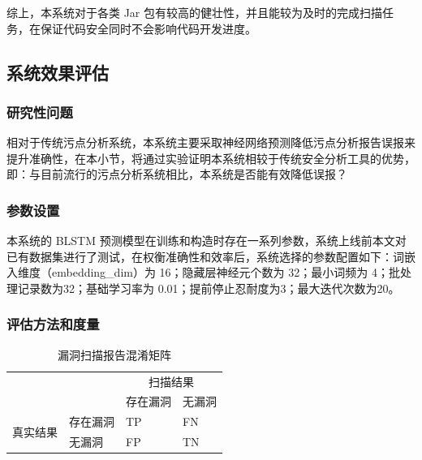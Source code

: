 综上，本系统对于各类 Jar 包有较高的健壮性，并且能较为及时的完成扫描任务，在保证代码安全同时不会影响代码开发进度。\\

\subsection{系统效果评估}

\subsubsection{研究性问题}
相对于传统污点分析系统，本系统主要采取神经网络预测降低污点分析报告误报来提升准确性，在本小节，将通过实验证明本系统相较于传统安全分析工具的优势，即：与目前流行的污点分析系统相比，本系统是否能有效降低误报？

\subsubsection{参数设置}
本系统的 BLSTM 预测模型在训练和构造时存在一系列参数，系统上线前本文对已有数据集进行了测试，在权衡准确性和效率后，系统选择的参数配置如下：词嵌入维度（embedding\_dim）为 16；隐藏层神经元个数为 32；最小词频为 4；批处理记录数为32；基础学习率为 0.01；提前停止忍耐度为3；最大迭代次数为20。\\

\subsubsection{评估方法和度量}
\begin{table}[htbp]\footnotesize
    \centering
    \caption{漏洞扫描报告混淆矩阵}
    \begin{tabular}{clll}
        \toprule
        \multicolumn{2}{c}{\multirow{2}[4]{*}{}} & \multicolumn{2}{c}{扫描结果} \\
        \cmidrule{3-4}    \multicolumn{2}{c}{} & 存在漏洞  & 无漏洞 \\
        \midrule
        \multirow{2}[2]{*}{真实结果} & 存在漏洞  & TP    & FN \\
        & 无漏洞   & FP    & TN \\
        \bottomrule
    \end{tabular}%
    \label{tab:confusionMatrix}%
\end{table}

